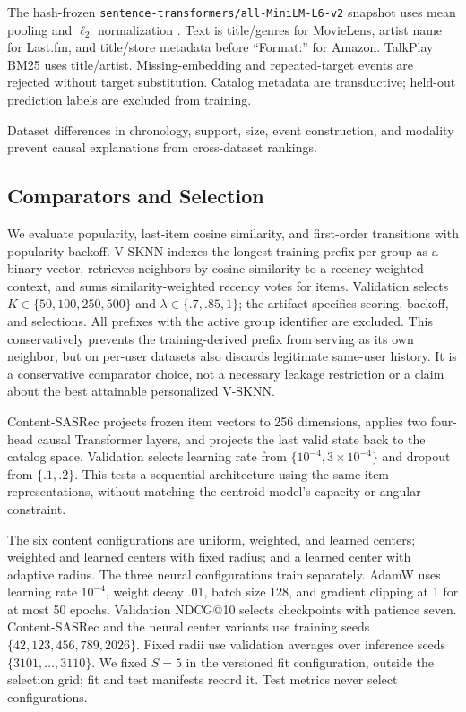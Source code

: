 \documentclass[runningheads]{llncs}
\begin{document}
The hash-frozen \texttt{sentence-transformers/all-MiniLM-L6-v2} snapshot uses
mean pooling and $\ell_2$ normalization \cite{reimers2019sbert,wang2020minilm}.
Text is title/genres for MovieLens, artist name for Last.fm, and title/store
metadata before ``Format:'' for Amazon. TalkPlay BM25 uses title/artist.
Missing-embedding and repeated-target events are rejected without target
substitution. Catalog metadata are transductive; held-out prediction labels
are excluded from training.

Dataset differences in chronology, support, size, event construction, and
modality prevent causal explanations from cross-dataset rankings.

\subsection{Comparators and Selection}

We evaluate popularity, last-item cosine similarity, and first-order transitions
with popularity backoff. V-SKNN indexes the longest training prefix per group
as a binary vector, retrieves neighbors by cosine similarity to a
recency-weighted context, and sums similarity-weighted recency votes for items.
Validation selects $K\in\{50,100,250,500\}$ and $\lambda\in\{.7,.85,1\}$;
the artifact specifies scoring, backoff, and selections. All prefixes with the
active group identifier are excluded. This conservatively prevents the
training-derived prefix from serving as its own neighbor, but on per-user
datasets also discards legitimate same-user history. It is a conservative
comparator choice, not a necessary leakage restriction or a claim about the
best attainable personalized V-SKNN.

Content-SASRec projects frozen item vectors to 256 dimensions, applies two
four-head causal Transformer layers, and projects the last valid state back to
the catalog space. Validation selects learning rate from
$\{10^{-4},3\!\times\!10^{-4}\}$ and dropout from $\{.1,.2\}$. This tests
a sequential architecture using the same item representations, without matching
the centroid model's capacity or angular constraint.

The six content configurations are uniform, weighted, and learned centers;
weighted and learned centers with fixed radius; and a learned center with
adaptive radius. The three neural configurations train separately. AdamW uses
learning rate $10^{-4}$, weight decay .01, batch size 128, and gradient clipping
at 1 for at most 50 epochs. Validation NDCG@10 selects checkpoints with patience
seven. Content-SASRec and the neural center variants use training seeds
$\{42,123,456,789,2026\}$. Fixed radii use validation averages over inference
seeds $\{3101,\ldots,3110\}$. We fixed $S=5$ in the versioned fit configuration,
outside the selection grid; fit and test manifests record it. Test metrics
never select configurations.
\end{document}

